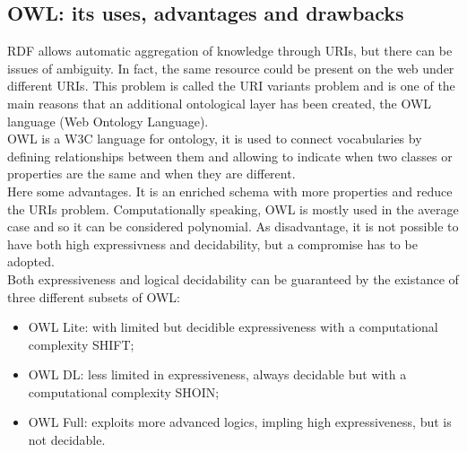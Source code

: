 \subsection{OWL: its uses, advantages and drawbacks}
RDF allows automatic aggregation of knowledge through URIs,
but there can be issues of ambiguity. In fact, the same resource
could be present on the web under different URIs.
This problem is called the URI variants problem and is one of the main
reasons that an additional ontological layer has been created,
the OWL language (Web Ontology Language).\\
OWL is a W3C language for ontology, it is used to connect
vocabularies by defining relationships between them and allowing
to indicate when two classes or properties are the same and when they
are different.\\
Here some advantages. It is an enriched schema with more properties
and reduce the URIs problem. Computationally speaking, OWL is mostly
used in the average case and so it can be considered polynomial.
As disadvantage, it is not possible to have both high expressivness
and decidability, but a compromise has to be adopted.\\
Both expressiveness and logical decidability can be guaranteed
by the existance of three different subsets of OWL:
\begin{itemize}
    \item OWL Lite: with limited but decidible expressiveness with a
    computational complexity SHIFT;
    \item OWL DL: less limited in expressiveness, always decidable but
    with a computational complexity SHOIN;
    \item OWL Full: exploits more advanced logics, impling high
    expressiveness, but is not decidable.
\end{itemize}

